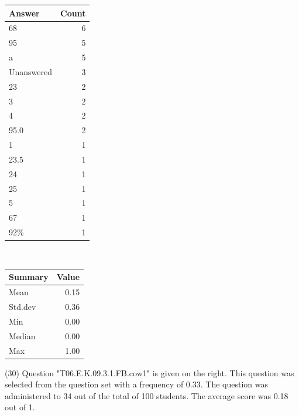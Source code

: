 \documentclass[12pt,nohyper]{tufte-handout}\usepackage[]{graphicx}\usepackage[]{color}
\begin{document}
\begin{center}%
\begin{tabular}{lr}
  \hline
Answer & Count \\ 
  \hline
68 &   6 \\ 
  95 &   5 \\ 
  a &   5 \\ 
  Unanswered &   3 \\ 
  23 &   2 \\ 
  3 &   2 \\ 
  4 &   2 \\ 
  95.0 &   2 \\ 
  1 &   1 \\ 
  23.5 &   1 \\ 
  24 &   1 \\ 
  25 &   1 \\ 
  5 &   1 \\ 
  67 &   1 \\ 
  92\% &   1 \\ 
   \hline
\end{tabular}
~~~~~~~~%
\begin{tabular}{lr}
  \hline
Summary & Value \\ 
  \hline
Mean & 0.15 \\ 
  Std.dev & 0.36 \\ 
  Min & 0.00 \\ 
  Median & 0.00 \\ 
  Max & 1.00 \\ 
   \hline
\end{tabular}
\end{center}\newpage{} (30) Question "T06.E.K.09.3.1.FB.cow1" is given on the right. This question was selected from the question set with a frequency of 0.33. The question was administered to 34 out of the total of 100 students. The average score was 0.18 out of 1.
\end{document}
